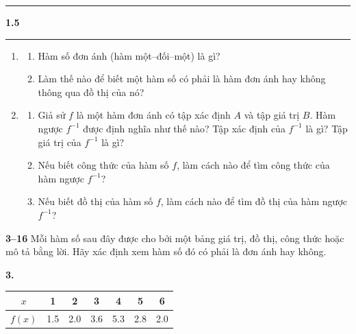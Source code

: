 \vspace{0.5em}

\noindent
{\color{stewartcyan}\rule{0.18\textwidth}{2pt}}\hspace{0.02\textwidth}%
{\LARGE\textbf{\textsf{\color{stewartcyan}1.5}}}\hspace{0.02\textwidth}%
{\color{stewartcyan}\rule{0.53\textwidth}{2pt}}

\vspace{0.3em}

\noindent
\begin{minipage}[t]{0.485\textwidth}
\fontsize{8.2pt}{10.2pt}\selectfont
    \begin{enumerate}[label=\textbf{\arabic*.}, leftmargin=*]
        \item \begin{enumerate}[label=(\alph*), leftmargin=*]
            \item Hàm số đơn ánh (hàm một--đối--một) là gì?
            \item Làm thế nào để biết một hàm số có phải là hàm đơn ánh hay không thông qua đồ thị của nó?
        \end{enumerate}

        \item \begin{enumerate}[label=(\alph*), leftmargin=*]
            \item Giả sử $f$ là một hàm đơn ánh có tập xác định $A$ và tập giá trị $B$. Hàm ngược $f^{-1}$ được định nghĩa như thế nào? Tập xác định của $f^{-1}$ là gì? Tập giá trị của $f^{-1}$ là gì?
            \item Nếu biết công thức của hàm số $f$, làm cách nào để tìm công thức của hàm ngược $f^{-1}$?
            \item Nếu biết đồ thị của hàm số $f$, làm cách nào để tìm đồ thị của hàm ngược $f^{-1}$?
        \end{enumerate}
    \end{enumerate}

    \noindent
    {\color{stewartcyan}\textbf{3--16}}\; Mỗi hàm số sau đây được cho bởi một bảng giá trị, đồ thị, công thức hoặc mô tả bằng lời. Hãy xác định xem hàm số đó có phải là đơn ánh hay không.

    \vspace{0.25em}
    \noindent
    \textbf{3.}\quad
    \begin{tabular}{|c|c|c|c|c|c|c|}
        \hline
        $x$ & 1 & 2 & 3 & 4 & 5 & 6 \\ \hline
        $f(x)$ & 1.5 & 2.0 & 3.6 & 5.3 & 2.8 & 2.0 \\ \hline
    \end{tabular}


\end{minipage}
